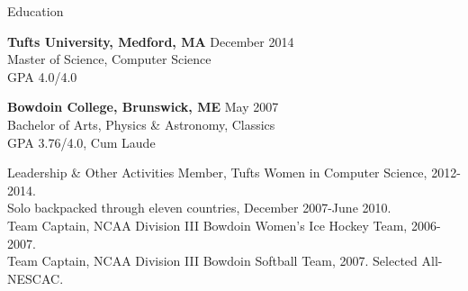 \documentclass{resume} %
\begin{document}
\begin{rSection}{Education}

{\bf Tufts University, Medford, MA} \hfill {December 2014} \\
Master of Science, Computer Science\\
GPA 4.0/4.0

{\bf Bowdoin College, Brunswick, ME} \hfill {May 2007} \\
Bachelor of Arts, Physics \& Astronomy, Classics \\
GPA 3.76/4.0, Cum Laude
\end{rSection}



\begin{rSection}{Leadership \& Other Activities}
Member, Tufts Women in Computer Science, 2012-2014. \\
Solo backpacked through eleven countries, December 2007-June 2010. \\
Team Captain, NCAA Division III Bowdoin Women's Ice Hockey Team, 2006-2007.\\
Team Captain, NCAA Division III Bowdoin Softball Team, 2007. Selected All-NESCAC.\\
\end{rSection}








\end{document}
